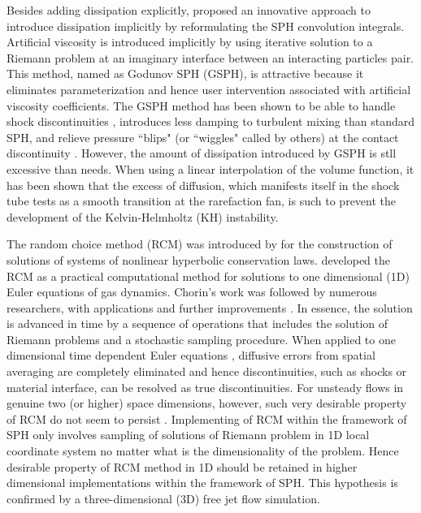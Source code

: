 \documentclass[review]{elsarticle}
\begin{document}
Besides adding dissipation explicitly, \citet{inutsuka2002reformulation} proposed an innovative approach to introduce dissipation implicitly by reformulating the SPH convolution integrals. Artificial viscosity is introduced implicitly by using iterative solution to a Riemann problem at an imaginary interface between an interacting particles pair. This method, named as Godunov SPH (GSPH), is attractive because it eliminates parameterization and hence user intervention associated with artificial viscosity coefficients. The GSPH method has been shown to be able to handle shock discontinuities \citep{inutsuka2002reformulation, cha2003implementations,iwasaki2011smoothed, puri2014approximate}, introduces less damping to turbulent mixing \citep{cha2010kelvin, borgani2012hydrodynamic} than standard SPH, and relieve pressure ``blips" (or ``wiggles" called by others) at the contact discontinuity \citep{borgani2012hydrodynamic}. However, the amount of dissipation introduced by GSPH is stll excessive than needs. When using a linear interpolation of the volume function, it has been shown \citep{borgani2012hydrodynamic} that the excess of diffusion, which manifests itself in the shock tube tests as a smooth transition at the rarefaction fan, is such to prevent the development of the Kelvin-Helmholtz (KH) instability.

The random choice method (RCM) was introduced by \citet{glimm1965solutions} for the construction of solutions of systems of nonlinear hyperbolic conservation laws. \citet{chorin1976random} developed the RCM as a practical computational method for solutions to one dimensional (1D) Euler equations of gas dynamics. Chorin's work was followed by numerous researchers, with applications and further improvements \citep{sod1977numerical,concus1979numerical,colella1982glimm, freistuhler1992numerical}. In essence, the solution is advanced in time by a sequence of operations that includes the solution of Riemann problems and a stochastic sampling procedure. When applied to one dimensional time dependent Euler equations \citep{colella1982glimm}, diffusive errors from spatial averaging are completely eliminated and hence discontinuities, such as shocks or material interface, can be resolved as true discontinuities.
For unsteady flows in genuine two (or higher) space dimensions, however, such very desirable property of RCM do not seem to persist \citep{colella1982glimm}. Implementing of RCM within the framework of SPH only involves sampling of solutions of Riemann problem in 1D local coordinate system no matter what is the dimensionality of the problem. Hence desirable property of RCM method in 1D should be retained in higher dimensional implementations within the framework of SPH. This hypothesis is confirmed by a three-dimensional (3D) free jet flow simulation.
\end{document}

